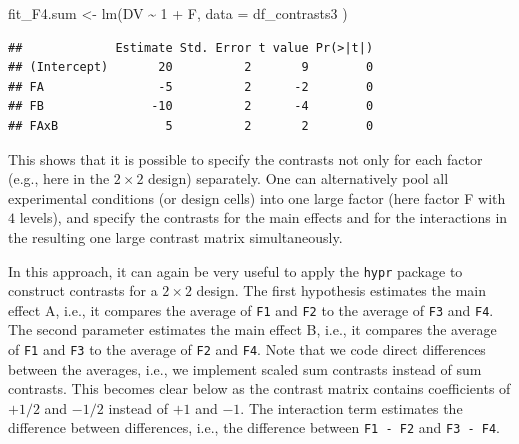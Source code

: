 \documentclass[
  12pt,
]{krantz}
\newenvironment{Shaded}{\begin{snugshade}}{\end{snugshade}}
\newcommand{\AttributeTok}[1]{\textcolor[rgb]{0.77,0.63,0.00}{#1}}
\newcommand{\DecValTok}[1]{\textcolor[rgb]{0.00,0.00,0.81}{#1}}
\newcommand{\FunctionTok}[1]{\textcolor[rgb]{0.00,0.00,0.00}{#1}}
\newcommand{\NormalTok}[1]{#1}
\newcommand{\OtherTok}[1]{\textcolor[rgb]{0.56,0.35,0.01}{#1}}
\newcommand{\SpecialCharTok}[1]{\textcolor[rgb]{0.00,0.00,0.00}{#1}}
\theoremstyle{definition}
\theoremstyle{definition}
\theoremstyle{definition}
\theoremstyle{definition}
\theoremstyle{remark}
\begin{document}
\begin{Shaded}
\begin{Highlighting}[]
\NormalTok{fit\_F4.sum }\OtherTok{\textless{}{-}} \FunctionTok{lm}\NormalTok{(DV }\SpecialCharTok{\textasciitilde{}} \DecValTok{1} \SpecialCharTok{+}\NormalTok{ F,}
  \AttributeTok{data =}\NormalTok{ df\_contrasts3}
\NormalTok{)}
\end{Highlighting}
\end{Shaded}

\begin{Shaded}
\end{Shaded}

\begin{verbatim}
##             Estimate Std. Error t value Pr(>|t|)
## (Intercept)       20          2       9        0
## FA                -5          2      -2        0
## FB               -10          2      -4        0
## FAxB               5          2       2        0
\end{verbatim}

This shows that it is possible to specify the contrasts not only for each factor (e.g., here in the \(2 \times 2\) design) separately. One can alternatively pool all experimental conditions (or design cells) into one large factor (here factor F with \(4\) levels), and specify the contrasts for the main effects and for the interactions in the resulting one large contrast matrix simultaneously.

In this approach, it can again be very useful to apply the \texttt{hypr} package to construct contrasts for a \(2 \times 2\) design. The first hypothesis estimates the main effect A, i.e., it compares the average of \texttt{F1} and \texttt{F2} to the average of \texttt{F3} and \texttt{F4}. The second parameter estimates the main effect B, i.e., it compares the average of \texttt{F1} and \texttt{F3} to the average of \texttt{F2} and \texttt{F4}. Note that we code direct differences between the averages, i.e., we implement scaled sum contrasts instead of sum contrasts. This becomes clear below as the contrast matrix contains coefficients of \(+1/2\) and \(-1/2\) instead of \(+1\) and \(-1\). The interaction term estimates the difference between differences, i.e., the difference between \texttt{F1\ -\ F2} and \texttt{F3\ -\ F4}.
\end{document}
